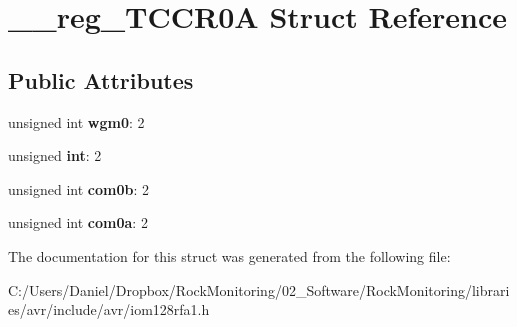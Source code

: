 \hypertarget{struct____reg___t_c_c_r0_a}{}\section{\+\_\+\+\_\+reg\+\_\+\+T\+C\+C\+R0A Struct Reference}
\label{struct____reg___t_c_c_r0_a}
\subsection*{Public Attributes}
\begin{DoxyCompactItemize}
\item 
unsigned int {\bfseries wgm0}\+: 2\hypertarget{struct____reg___t_c_c_r0_a_a9bf4b0ff0c1fbd0928d7f78a1b698428}{}\label{struct____reg___t_c_c_r0_a_a9bf4b0ff0c1fbd0928d7f78a1b698428}

\item 
unsigned {\bfseries int}\+: 2\hypertarget{struct____reg___t_c_c_r0_a_ae9dbb0d9c9964468710b929822f704be}{}\label{struct____reg___t_c_c_r0_a_ae9dbb0d9c9964468710b929822f704be}

\item 
unsigned int {\bfseries com0b}\+: 2\hypertarget{struct____reg___t_c_c_r0_a_ac9ae155ccaaa447254523f0b8162dcae}{}\label{struct____reg___t_c_c_r0_a_ac9ae155ccaaa447254523f0b8162dcae}

\item 
unsigned int {\bfseries com0a}\+: 2\hypertarget{struct____reg___t_c_c_r0_a_a36c05e0f484ae7266626210b577a20d4}{}\label{struct____reg___t_c_c_r0_a_a36c05e0f484ae7266626210b577a20d4}

\end{DoxyCompactItemize}


The documentation for this struct was generated from the following file\+:\begin{DoxyCompactItemize}
\item 
C\+:/\+Users/\+Daniel/\+Dropbox/\+Rock\+Monitoring/02\+\_\+\+Software/\+Rock\+Monitoring/libraries/avr/include/avr/iom128rfa1.\+h\end{DoxyCompactItemize}
